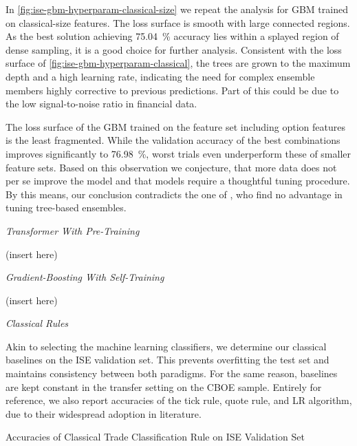 In \cref{fig:ise-gbm-hyperparam-classical-size} we repeat the analysis for \gls{GBM} trained on classical-size features. The loss surface is smooth with large connected regions. As the best solution achieving \SI{75.04}{\percent} accuracy lies within a splayed region of dense sampling, it is a good choice for further analysis. Consistent with the loss surface of \cref{fig:ise-gbm-hyperparam-classical}, the trees are grown to the maximum depth and a high learning rate, indicating the need for complex ensemble members highly corrective to previous predictions. Part of this could be due to the low signal-to-noise ratio in financial data.

The loss surface of the \gls{GBM} trained on the feature set including option features is the least fragmented. While the validation accuracy of the best combinations improves significantly to \SI{76.98}{\percent}, worst trials even underperform these of smaller feature sets. Based on this observation we conjecture, that more data does not per se improve the model and that models require a thoughtful tuning procedure. By this means, our conclusion contradicts the one of \textcite[][14]{ronenMachineLearningTrade2022}, who find no advantage in tuning tree-based ensembles.

\emph{Transformer With Pre-Training}

(insert here)

\emph{Gradient-Boosting With Self-Training}

(insert here)

\emph{Classical Rules}

Akin to selecting the machine learning classifiers, we determine our classical baselines on the \gls{ISE} validation set. This prevents \gls{overfitting} the test set and maintains consistency between both paradigms. For the same reason, baselines are kept constant in the transfer setting on the \gls{CBOE} sample. Entirely for reference, we also report accuracies of the tick rule, quote rule, and \gls{LR} algorithm, due to their widespread adoption in literature.

\begin{table}[H]
    \centering
    \caption[Accuracies of Classical Trade Classification Rule on  Validation Set]{Accuracies of Classical Trade Classification Rule on \gls{ISE} Validation Set}
    \label{tab:ise-classical-hyperparam-classical-size}
    
\end{table}


